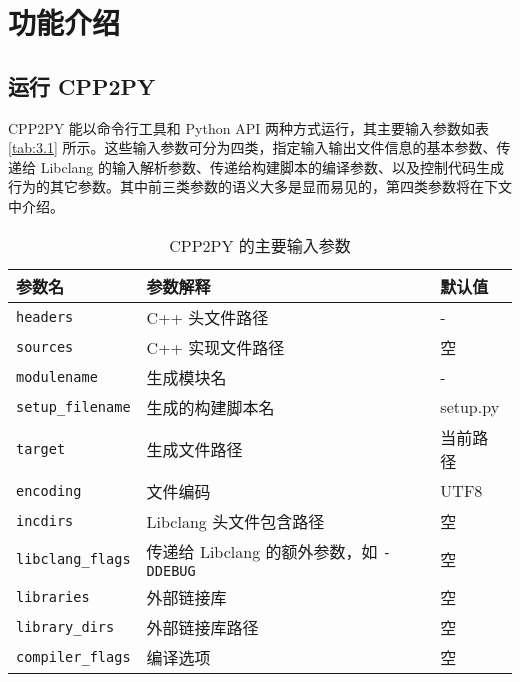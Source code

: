 
\chapter{功能介绍}

\section{运行 CPP2PY}

CPP2PY 能以命令行工具和 Python API 两种方式运行，其主要输入参数如表 \ref{tab:3.1} 所示。这些输入参数可分为四类，指定输入输出文件信息的基本参数、传递给 Libclang 的输入解析参数、传递给构建脚本的编译参数、以及控制代码生成行为的其它参数。其中前三类参数的语义大多是显而易见的，第四类参数将在下文中介绍。

\begin{table}
  \centering
  \caption{CPP2PY 的主要输入参数}
  \begin{tabular}{lll}
    \toprule
     参数名                 &  参数解释                                  &  默认值   \\
    \midrule
     \lstinline$headers$                &  C++ 头文件路径                            &  -        \\
     \lstinline$sources$                &  C++ 实现文件路径                          &  空       \\
     \lstinline$modulename$             &  生成模块名                                &  -        \\
     \lstinline$setup_filename$         &  生成的构建脚本名                          &  setup.py \\
     \lstinline$target$                 &  生成文件路径                              &  当前路径 \\
     \lstinline$encoding$               &  文件编码                                  &  UTF8     \\
     \lstinline$incdirs$                &  Libclang 头文件包含路径                   &  空       \\
     \lstinline$libclang_flags$         &  传递给 Libclang 的额外参数，如 \lstinline$-DDEBUG$  &  空       \\
     \lstinline$libraries$              &  外部链接库                                &  空       \\
     \lstinline$library_dirs$           &  外部链接库路径                            &  空       \\
     \lstinline$compiler_flags$         &  编译选项                                  &  空       \\

\end{tabular}
\end{table}

